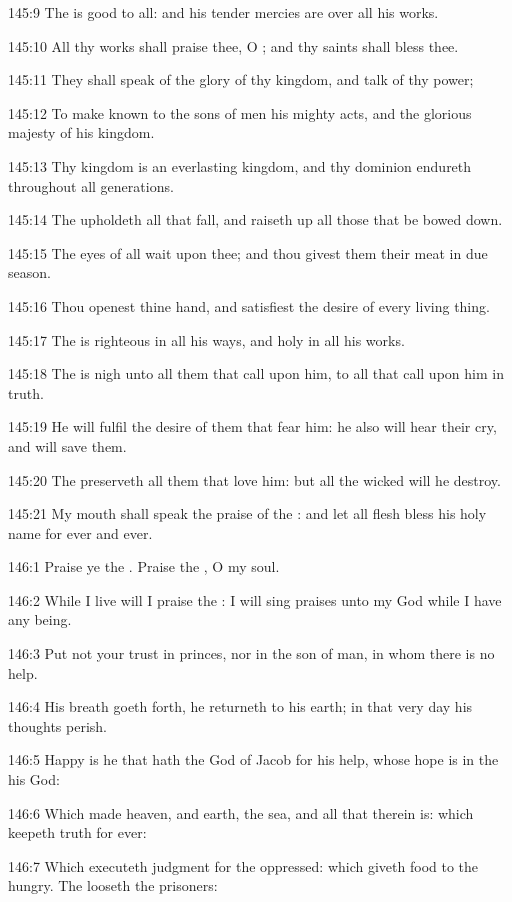 145:9 The \LORD is good to all: and his tender mercies are over all his
works.

145:10 All thy works shall praise thee, O \LORD; and thy saints shall
bless thee.

145:11 They shall speak of the glory of thy kingdom, and talk of thy
power;

145:12 To make known to the sons of men his mighty acts, and the
glorious majesty of his kingdom.

145:13 Thy kingdom is an everlasting kingdom, and thy dominion
endureth throughout all generations.

145:14 The \LORD upholdeth all that fall, and raiseth up all those that
be bowed down.

145:15 The eyes of all wait upon thee; and thou givest them their meat
in due season.

145:16 Thou openest thine hand, and satisfiest the desire of every
living thing.

145:17 The \LORD is righteous in all his ways, and holy in all his
works.

145:18 The \LORD is nigh unto all them that call upon him, to all that
call upon him in truth.

145:19 He will fulfil the desire of them that fear him: he also will
hear their cry, and will save them.

145:20 The \LORD preserveth all them that love him: but all the wicked
will he destroy.

145:21 My mouth shall speak the praise of the \LORD: and let all flesh
bless his holy name for ever and ever.



146:1 Praise ye the \LORD. Praise the \LORD, O my soul.

146:2 While I live will I praise the \LORD: I will sing praises unto my
God while I have any being.

146:3 Put not your trust in princes, nor in the son of man, in whom
there is no help.

146:4 His breath goeth forth, he returneth to his earth; in that very
day his thoughts perish.

146:5 Happy is he that hath the God of Jacob for his help, whose hope
is in the \LORD his God:

146:6 Which made heaven, and earth, the sea, and all that therein is:
which keepeth truth for ever:

146:7 Which executeth judgment for the oppressed: which giveth food to
the hungry. The \LORD looseth the prisoners:

